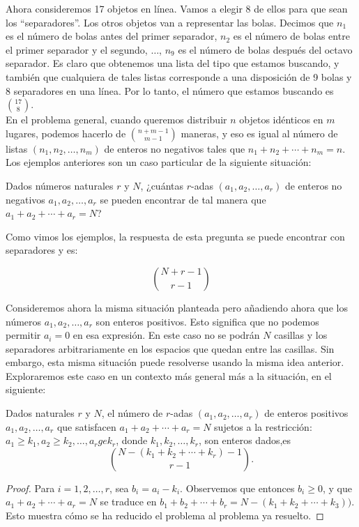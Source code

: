 \documentclass[11pt]{scrartcl}
\begin{document}
Ahora consideremos 17 objetos en línea. Vamos a elegir 8 de ellos para que sean los ``separadores''. Los otros objetos van a representar las bolas. Decimos que $n_1$ es el número de bolas antes del primer separador, $n_2$ es el número de bolas entre el primer separador y el segundo, $\dots$, $n_9$ es el número de bolas después del octavo separador. Es claro que obtenemos una lista del tipo que estamos buscando, y también que cualquiera de tales listas corresponde a una disposición de 9 bolas y 8 separadores en una línea. Por lo tanto, el número que estamos buscando es $\binom{17}{8}$.\\

En el problema general, cuando queremos distribuir $n$ objetos idénticos en $m$ lugares, podemos hacerlo de $\binom{n+m-1}{m-1}$ maneras, y eso es igual al número de listas $(n_1, n_2, \dots, n_m)$ de enteros no negativos tales que $n_1 + n_2 + \cdots + n_m = n$.\\

Los ejemplos anteriores son un caso particular de la siguiente situación:
\begin{theorem}
Dados números naturales $r$ y $N$, ¿cuántas $r$-adas $(a_1, a_2, \dots, a_r)$ de enteros no negativos $a_1, a_2, \dots, a_r$ se pueden encontrar de tal manera que $a_1 + a_2 + \cdots + a_r = N$?
\end{theorem}
Como vimos los ejemplos, la respuesta de esta pregunta se puede encontrar con separadores y es:

\[
\binom{N+r-1}{r-1}
\]

Consideremos ahora la misma situación planteada pero añadiendo ahora que los números $a_1, a_2, \dots, a_r$ son enteros positivos. Esto significa que no podemos permitir $a_i = 0$ en esa expresión. En este caso no se podrán $N$ casillas y los separadores arbitrariamente en los espacios que quedan entre las casillas. Sin embargo, esta misma situación puede resolverse usando la misma idea anterior. Exploraremos este caso en un contexto más general más a la situación, en el siguiente:

\begin{theorem}
Dados naturales $r$ y $N$, el número de $r$-adas $(a_1, a_2, \dots, a_r)$ de enteros positivos $a_1, a_2, \dots, a_r$ que satisfacen $a_1 + a_2 + \cdots + a_r = N$ sujetos a la restricción: \(a_1\ge k_1, a_2\ge k_2,\ldots, a_r
ge k_r\), donde \(k_1,k_2,\ldots, k_r\), son enteros dados,es
\[
\binom{N-(k_1+k_2+\cdots+k_r)-1}{r-1}.
\]
\end{theorem}
\begin{proof}
Para $i = 1, 2, \dots, r$, sea $b_i = a_i - k_i$. Observemos que entonces $b_i \geq 0$, y que $a_1 + a_2 + \cdots + a_r = N$ se traduce en $b_1 + b_2 + \cdots + b_r = N - (k_1+k_2+\cdots+k_3))$. Esto muestra cómo se ha reducido el problema al problema ya resuelto.
\end{proof}
\end{document}
